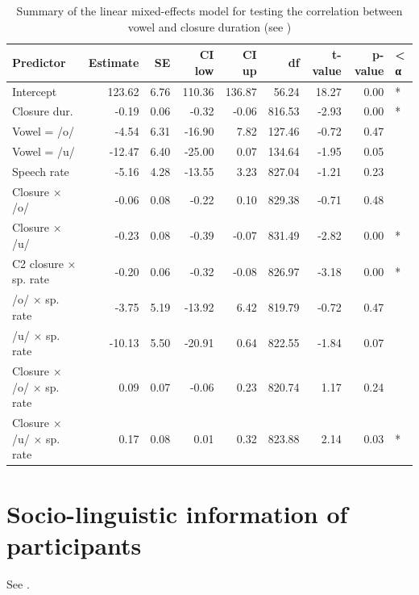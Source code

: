 \documentclass[charis]{glossa}
\begin{document}
\begin{table}[t]

\caption{\label{tab:vow-clo-table}Summary of the linear mixed-effects model for testing the correlation between vowel and closure duration (see )}
\centering
\fontsize{8}{10}\selectfont
\begin{tabular}{lrrrrrrrl}
\toprule
Predictor & Estimate & SE & CI low & CI up & df & t-value & p-value & < α\\
\midrule
Intercept & 123.62 & 6.76 & 110.36 & 136.87 & 56.24 & 18.27 & 0.00 & *\\
Closure dur. & -0.19 & 0.06 & -0.32 & -0.06 & 816.53 & -2.93 & 0.00 & *\\
Vowel = /o/ & -4.54 & 6.31 & -16.90 & 7.82 & 127.46 & -0.72 & 0.47 & \\
Vowel = /u/ & -12.47 & 6.40 & -25.00 & 0.07 & 134.64 & -1.95 & 0.05 & \\
Speech rate & -5.16 & 4.28 & -13.55 & 3.23 & 827.04 & -1.21 & 0.23 & \\
Closure × /o/ & -0.06 & 0.08 & -0.22 & 0.10 & 829.38 & -0.71 & 0.48 & \\
Closure × /u/ & -0.23 & 0.08 & -0.39 & -0.07 & 831.49 & -2.82 & 0.00 & *\\
C2 closure × sp. rate & -0.20 & 0.06 & -0.32 & -0.08 & 826.97 & -3.18 & 0.00 & *\\
/o/ × sp. rate & -3.75 & 5.19 & -13.92 & 6.42 & 819.79 & -0.72 & 0.47 & \\
/u/ × sp. rate & -10.13 & 5.50 & -20.91 & 0.64 & 822.55 & -1.84 & 0.07 & \\
Closure × /o/ × sp. rate & 0.09 & 0.07 & -0.06 & 0.23 & 820.74 & 1.17 & 0.24 & \\
Closure × /u/ × sp. rate & 0.17 & 0.08 & 0.01 & 0.32 & 823.88 & 2.14 & 0.03 & *\\
\bottomrule
\end{tabular}
\end{table}

\hypertarget{socio-linguistic-information-of-participants}{%
\section{Socio-linguistic information of
participants}\label{socio-linguistic-information-of-participants}}

\label{a:socioling}

See .
\end{document}
